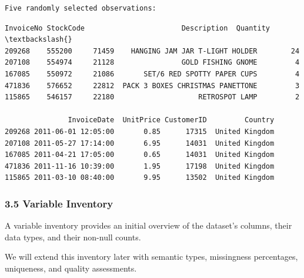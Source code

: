 \documentclass[11pt]{article}
\begin{document}
    
    \begin{Verbatim}[commandchars=\\\{\}]
Five randomly selected observations:
    \end{Verbatim}

    
    \begin{Verbatim}[commandchars=\\\{\}]
       InvoiceNo StockCode                       Description  Quantity  \textbackslash{}
209268    555200     71459    HANGING JAM JAR T-LIGHT HOLDER        24   
207108    554974     21128                GOLD FISHING GNOME         4   
167085    550972     21086       SET/6 RED SPOTTY PAPER CUPS         4   
471836    576652     22812  PACK 3 BOXES CHRISTMAS PANETTONE         3   
115865    546157     22180                    RETROSPOT LAMP         2   

               InvoiceDate  UnitPrice CustomerID         Country  
209268 2011-06-01 12:05:00       0.85      17315  United Kingdom  
207108 2011-05-27 17:14:00       6.95      14031  United Kingdom  
167085 2011-04-21 17:05:00       0.65      14031  United Kingdom  
471836 2011-11-16 10:39:00       1.95      17198  United Kingdom  
115865 2011-03-10 08:40:00       9.95      13502  United Kingdom  
    \end{Verbatim}

    
    \subsubsection{3.5 Variable Inventory}\label{variable-inventory}

A variable inventory provides an initial overview of the dataset's
columns, their data types, and their non-null counts.

We will extend this inventory later with semantic types, missingness
percentages, uniqueness, and quality assessments.
\end{document}
